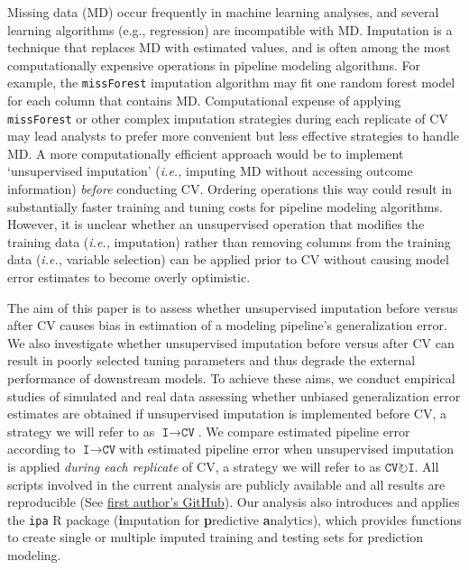 \documentclass[AMA,STIX1COL,doublespace]{WileyNJD-v2}
\begin{document}
Missing data (MD) occur frequently in machine learning analyses, and
several learning algorithms (e.g., regression) are incompatible with MD.
Imputation is a technique that replaces MD with estimated values, and is
often among the most computationally expensive operations in pipeline
modeling algorithms. For example, the \texttt{missForest} imputation
algorithm may fit one random forest model for each column that contains
MD. Computational expense of applying \texttt{missForest} or other
complex imputation strategies during each replicate of CV may lead
analysts to prefer more convenient but less effective strategies to
handle MD.\citep{stekhoven2011missforest} A more computationally
efficient approach would be to implement `unsupervised imputation'
(\textit{i.e., }imputing MD without accessing outcome information)
\emph{before} conducting CV. Ordering operations this way could result
in substantially faster training and tuning costs for pipeline modeling
algorithms. However, it is unclear whether an unsupervised operation
that modifies the training data (\textit{i.e., }imputation) rather than
removing columns from the training data (\textit{i.e., }variable
selection) can be applied prior to CV without causing model error
estimates to become overly optimistic.

The aim of this paper is to assess whether unsupervised imputation
before versus after CV causes bias in estimation of a modeling
pipeline's generalization error. We also investigate whether
unsupervised imputation before versus after CV can result in poorly
selected tuning parameters and thus degrade the external performance of
downstream models. To achieve these aims, we conduct empirical studies
of simulated and real data assessing whether unbiased generalization
error estimates are obtained if unsupervised imputation is implemented
before CV, a strategy we will refer to as
$\texttt{I}\!\!\rightarrow\!\texttt{CV}$. We compare estimated pipeline
error according to $\texttt{I}\!\!\rightarrow\!\texttt{CV}$\space with
estimated pipeline error when unsupervised imputation is applied
\emph{during each replicate} of CV, a strategy we will refer to as
$\texttt{CV}\!\circlearrowright\!\texttt{I}$. All scripts involved in
the current analysis are publicly available and all results are
reproducible (See
\href{https://github.com/bcjaeger/Imputation-and-CV}{first author's
GitHub}). Our analysis also introduces and applies the \texttt{ipa} R
package (\textbf{i}mputation for \textbf{p}redictive
\textbf{a}nalytics), which provides functions to create single or
multiple imputed training and testing sets for prediction modeling.
\end{document}
